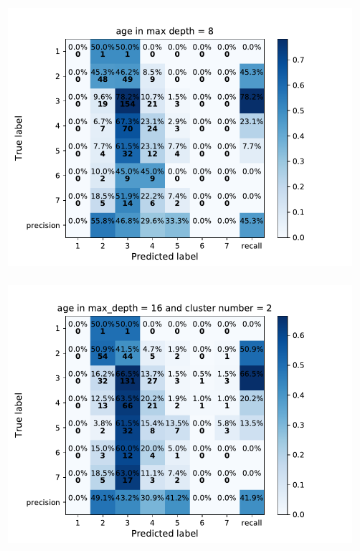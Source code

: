 {\begin{figure}[h]
    \centering
    \begin{subfigure}
      \centering
      \includegraphics[scale=0.45]{fig/super_rf_age.pdf}
    \end{subfigure}%
    \begin{subfigure}
      \centering
      \includegraphics[scale=0.45]{fig/kms_rf_age.pdf}
    \end{subfigure}
\end{figure}

}
